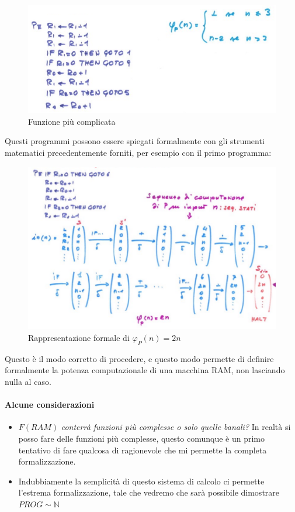\documentclass{article}
\begin{document}
\begin{figure}[H]
    \centering
    \includegraphics[scale=0.5]{images/n_complx.png}
    \caption{Funzione più complicata}
\end{figure}

Questi programmi possono essere spiegati formalmente con gli strumenti matematici precedentemente
forniti, per esempio con il primo programma:

\begin{figure}[H]
    \centering
    \includegraphics[scale=0.4]{images/n_formale.png}
    \caption{Rappresentazione formale di $\varphi_P(n)=2n$}
\end{figure}

Questo è il modo corretto di procedere, e questo modo permette di definire formalmente
la potenza computazionale di una macchina RAM, non lasciando nulla al caso.

\paragraph{Alcune considerazioni}
\begin{itemize}
    \item $F(RAM)$ \textit{conterrà funzioni più complesse o solo quelle banali?} In realtà
          si posso fare delle funzioni più complesse, questo comunque è un primo
          tentativo di fare qualcosa di ragionevole che mi permette la completa formalizzazione.
    \item Indubbiamente la semplicità di questo sistema di calcolo ci permette l'estrema
          formalizzazione, tale che vedremo che sarà possibile dimostrare $PROG\sim\mathbb{N}$
\end{itemize}
\end{document}

